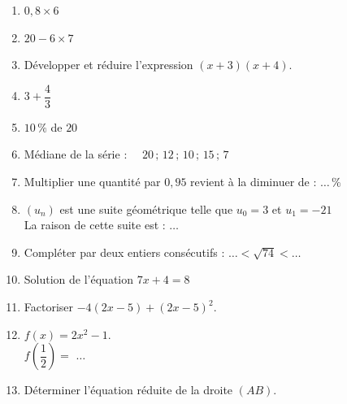 \documentclass[a4paper,11pt,landscape,exos]{nsi} %
\begin{document}
\begin{multicols}{2}
\maketitle

\begin{enumerate}[]
	\item $0{,}8\times6$
	\item $20-6\times7$
	\item Développer et réduire l'expression $(x+3)(x+4)$.
	\item $3+\dfrac{4}{3}$ 
	\item $10\,\%$ de $20$
	\item Médiane de la série : $\quad 20\,;\,12\,;\,10\,;\,15\,;\,7$
	\item Multiplier une quantité par $0{,}95$ revient à la diminuer de : $\ldots\,\%$
	\item $(u_n)$ est une suite géométrique telle que $u_0=3$ et $u_1=-21$\\La raison de cette suite est :  $\ldots$
	\item Compléter par deux entiers consécutifs : $\ldots < \sqrt{74} < \ldots$
	\item Solution de l'équation $7x+4=8$
	\item  Factoriser   $-4(2x-5)+(2x-5)^2$.
	\item $f(x)=2x^2-1$.\\[.5em]
	$f\left(\dfrac{1}{2}\right)=$ $\ldots$
	\item Déterminer l'équation réduite de la droite $(AB)$.\\    \begin{tikzpicture}[baseline,scale = 0.6]


\end{tikzpicture}
\end{enumerate}
\end{multicols}
\end{document}
